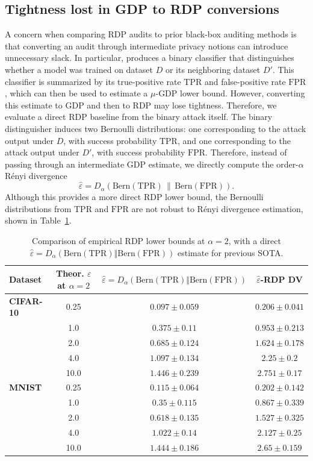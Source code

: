\documentclass{article}
\theoremstyle{plain}
\theoremstyle{definition}
\theoremstyle{remark}
\begin{document}
\subsection{Tightness lost in GDP to RDP conversions}

A concern when comparing RDP audits to prior black-box auditing methods is that converting an audit through intermediate privacy notions can introduce unnecessary slack. In particular, \cite{muthu2024nearly} produces a binary classifier that distinguishes whether a model was trained on dataset $D$ or its neighboring dataset $D'$. This classifier is summarized by its true-positive rate $\mathrm{TPR}$ and false-positive rate $\mathrm{FPR}$, which can then be used to estimate a $\mu$-GDP lower bound. However, converting this estimate to GDP and then to RDP may lose tightness. Therefore, we evaluate a direct RDP baseline from the binary attack itself. The binary distinguisher induces two Bernoulli distributions: one corresponding to the attack output under $D$, with success probability $\mathrm{TPR}$, and one corresponding to the attack output under $D'$, with success probability $\mathrm{FPR}$. Therefore, instead of passing through an intermediate GDP estimate, we directly compute the order-$\alpha$ Rényi divergence
\[
\hat{\varepsilon}
=
D_{\alpha}
\left(
\mathrm{Bern}(\mathrm{TPR})
\,\middle\|\,
\mathrm{Bern}(\mathrm{FPR})
\right).
\]
Although this provides a more direct RDP lower bound, the Bernoulli distributions from $\mathrm{TPR}$ and $\mathrm{FPR}$ are not robust to R\'enyi divergence estimation, shown in Table~\ref{tab:rdp-direct-comparison}.


\begin{table}[t]
\centering
\caption{Comparison of empirical RDP lower bounds at $\alpha=2$, with a direct $\hat{\varepsilon}=D_{\alpha}(\mathrm{Bern(TPR)}\Vert \mathrm{Bern(FPR)})$ estimate for previous SOTA.}
\label{tab:rdp-direct-comparison}
\begin{tabular}{lccc}
\toprule
Dataset &
Theor. $\varepsilon$ at $\alpha=2$ &
$\hat{\varepsilon}=D_{\alpha}(\mathrm{Bern(TPR)}\Vert \mathrm{Bern(FPR)})$ &
$\hat{\varepsilon}$-RDP DV \\
\midrule
\textbf{CIFAR-10} & 0.25 & $0.097 \pm 0.059$ & $\mathbf{0.206} \pm 0.041$ \\
 & 1.0 & $0.375 \pm 0.11$ & $\mathbf{0.953} \pm 0.213$ \\
 & 2.0 & $0.685 \pm 0.124$ & $\mathbf{1.624} \pm 0.178$ \\
 & 4.0 & $1.097 \pm 0.134$ & $\mathbf{2.25} \pm 0.2$ \\
 & 10.0 & $1.446 \pm 0.239$ & $\mathbf{2.751} \pm 0.17$ \\
\midrule
\textbf{MNIST} & 0.25 & $0.115 \pm 0.064$ & $\mathbf{0.202} \pm 0.142$ \\
 & 1.0 & $0.35 \pm 0.115$ & $\mathbf{0.867} \pm 0.339$ \\
 & 2.0 & $0.618 \pm 0.135$ & $\mathbf{1.527} \pm 0.325$ \\
 & 4.0 & $1.022 \pm 0.14$ & $\mathbf{2.127} \pm 0.25$ \\
 & 10.0 & $1.444 \pm 0.186$ & $\mathbf{2.65} \pm 0.159$ \\
\bottomrule
\end{tabular}
\end{table}
\end{document}
